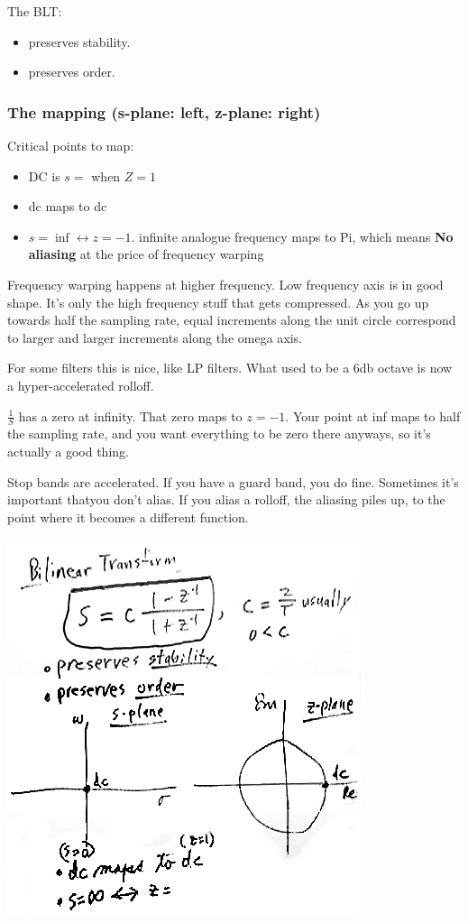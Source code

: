 The BLT:
\begin{itemize}
\item{preserves stability.}
\item{preserves order. }
\end{itemize}

\subsubsection*{The mapping (s-plane: left, z-plane: right)}

Critical points to map:
\begin{itemize}
\item{DC is $s = $ when $Z = 1$}
\item{dc maps to dc}
\item{$s = \inf \leftrightarrow z = -1$. infinite analogue frequency maps to
Pi, which means \textbf{No aliasing} at the price of frequency warping}
\end{itemize}

Frequency warping happens at higher frequency. Low frequency axis is in good shape.
It's only the high frequency stuff that gets compressed. As you go up
towards half the sampling rate, equal increments along the unit circle 
correspond to larger and larger increments along the omega axis. 

For some filters this is nice, like LP filters. What used to be a 6db octave is
now a hyper-accelerated rolloff. 

$\frac{1}{S}$ has a zero at infinity. That zero maps to $z = -1$. Your
point at inf maps to half the sampling rate, and you want everything to be
zero there anyways, so it's actually a good thing.

Stop bands are accelerated. If you have a guard band, you do fine. 
Sometimes it's important thatyou don't alias. If you alias a rolloff, 
the aliasing piles up, to the point where it becomes a different function.

\includegraphics[scale=0.5]{frames/10b}\\
\\

